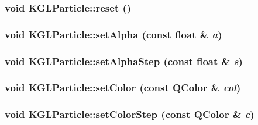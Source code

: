 \hypertarget{class_k_g_l_particle_28a0fed37487b9b14f822b5b30ff5e09}{
\subsubsection[{reset}]{\setlength{\rightskip}{0pt plus 5cm}void KGLParticle::reset ()}}
\label{class_k_g_l_particle_28a0fed37487b9b14f822b5b30ff5e09}


\hypertarget{class_k_g_l_particle_4ad871207f00236ff4aef3711710771f}{
\subsubsection[{setAlpha}]{\setlength{\rightskip}{0pt plus 5cm}void KGLParticle::setAlpha (const float \& {\em a})}}
\label{class_k_g_l_particle_4ad871207f00236ff4aef3711710771f}


\hypertarget{class_k_g_l_particle_410d9b3a43554f25386763f3a1800eeb}{
\subsubsection[{setAlphaStep}]{\setlength{\rightskip}{0pt plus 5cm}void KGLParticle::setAlphaStep (const float \& {\em s})}}
\label{class_k_g_l_particle_410d9b3a43554f25386763f3a1800eeb}


\hypertarget{class_k_g_l_particle_e4f6170615e9a4318b71e54146e81bb5}{
\subsubsection[{setColor}]{\setlength{\rightskip}{0pt plus 5cm}void KGLParticle::setColor (const QColor \& {\em col})}}
\label{class_k_g_l_particle_e4f6170615e9a4318b71e54146e81bb5}


\hypertarget{class_k_g_l_particle_0cbaf806d3692135ff4a874b0c9e0cfc}{
\subsubsection[{setColorStep}]{\setlength{\rightskip}{0pt plus 5cm}void KGLParticle::setColorStep (const QColor \& {\em c})}}
\label{class_k_g_l_particle_0cbaf806d3692135ff4a874b0c9e0cfc}


